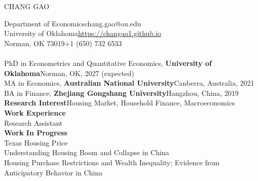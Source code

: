 \documentclass[10pt,letterpaper]{article}
\begin{document}
	\begin{center}
		{\Large CHANG GAO}
	\end{center}
	\noindent Department of Economics\hfill chang.gao@ou.edu\medskip\\
	University of Oklahoma\hfill\href{https://changao1.github.io}{https://changao1.github.io}\medskip\\
Norman, OK   73019\hfill+1 (650) 732 6533\bigskip\\
	\medskip\\
	PhD in Econometrics and Quantitative Economics, {\bf University of Oklahoma}\hfill Norman, OK, 2027 (expected)\medskip\\
    MA in Economics, {\bf Australian National University}\hfill Canberra, Australia, 2021\medskip\\
	BA in Finance, {\bf Zhejiang Gongshang University}\hfill Hangzhou, China, 2019\bigskip\\
	{\bf Research Interest}\hfill Housing Market, Household Finance, Macroeconomics\bigskip\\
	{\bf Work Experience}\medskip\\
		Research Assistant\medskip\\
	{\bf Work In Progress}\medskip\\
Texas Housing Price\smallskip\\
Understanding Housing Boom and Collapse in China\smallskip\\
Housing Purchase Restrictions and Wealth Inequality: Evidence from Anticipatory Behavior in China\smallskip\\
\end{document}
